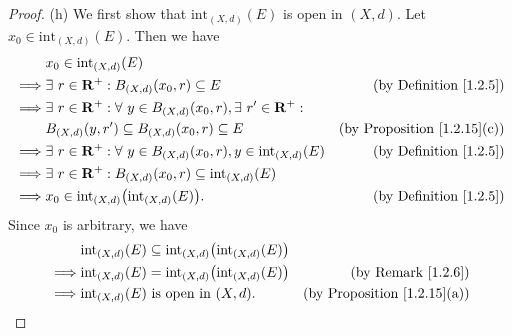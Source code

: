 \begin{proof}{(h)}
    We first show that \(\text{int}_{(X, d)}(E)\) is open in \((X, d)\).
    Let \(x_0 \in \text{int}_{(X, d)}(E)\).
    Then we have
    \begin{align*}
                 & x_0 \in \text{int}_{(X, d)}(E)                                                                                                            \\
        \implies & \exists\ r \in \mathbf{R}^+ : B_{(X, d)}(x_0, r) \subseteq E                                    & \text{(by Definition \ref{1.2.5})}      \\
        \implies & \exists\ r \in \mathbf{R}^+ : \forall\ y \in B_{(X, d)}(x_0, r), \exists\ r' \in \mathbf{R}^+ :                                           \\
                 & B_{(X, d)}(y, r') \subseteq B_{(X, d)}(x_0, r) \subseteq E                                      & \text{(by Proposition \ref{1.2.15}(c))} \\
        \implies & \exists\ r \in \mathbf{R}^+ : \forall\ y \in B_{(X, d)}(x_0, r), y \in \text{int}_{(X, d)}(E)   & \text{(by Definition \ref{1.2.5})}      \\
        \implies & \exists\ r \in \mathbf{R}^+ : B_{(X, d)}(x_0, r) \subseteq \text{int}_{(X, d)}(E)                                                         \\
        \implies & x_0 \in \text{int}_{(X, d)}\big(\text{int}_{(X, d)}(E)\big).                                    & \text{(by Definition \ref{1.2.5})}
    \end{align*}
    Since \(x_0\) is arbitrary, we have
    \begin{align*}
                 & \text{int}_{(X, d)}(E) \subseteq \text{int}_{(X, d)}\big(\text{int}_{(X, d)}(E)\big)                                           \\
        \implies & \text{int}_{(X, d)}(E) = \text{int}_{(X, d)}\big(\text{int}_{(X, d)}(E)\big)         & \text{(by Remark \ref{1.2.6})}          \\
        \implies & \text{int}_{(X, d)}(E) \text{ is open in } (X, d).                                   & \text{(by Proposition \ref{1.2.15}(a))}
    \end{align*}


\end{proof}
